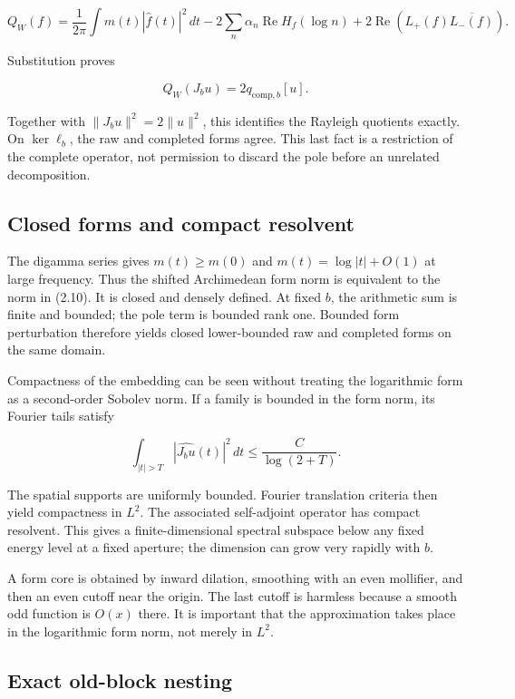 \documentclass[
  10pt,
  a4paper,
  10pt,
  oneside,
  openany]{book}
\begin{document}
\[
Q_W(f)=\frac1{2\pi}\int m(t)|\widehat f(t)|^2\,dt
-2\sum_n\alpha_n\operatorname{Re}H_f(\log n)
+2\operatorname{Re}\!\left(L_+(f)\overline{L_-(f)}\right).
\tag{4.8}\label{eq:4.8}
\]

Substitution proves

\[
Q_W(J_bu)=2q_{\mathrm{comp},b}[u].
\tag{4.9}\label{eq:4.9}
\]

Together with \(\|J_bu\|^2=2\|u\|^2\), this identifies the Rayleigh
quotients exactly. On \(\ker\ell_b\), the raw and completed forms agree.
This last fact is a restriction of the complete operator, not permission
to discard the pole before an unrelated decomposition.

\subsection{Closed forms and compact
resolvent}\label{closed-forms-and-compact-resolvent}

The digamma series gives \(m(t)\ge m(0)\) and \(m(t)=\log|t|+O(1)\) at
large frequency. Thus the shifted Archimedean form norm is equivalent to
the norm in (2.10). It is closed and densely defined. At fixed \(b\),
the arithmetic sum is finite and bounded; the pole term is bounded rank
one. Bounded form perturbation therefore yields closed lower-bounded raw
and completed forms on the same domain.

Compactness of the embedding can be seen without treating the
logarithmic form as a second-order Sobolev norm. If a family is bounded
in the form norm, its Fourier tails satisfy

\[
\int_{|t|>T}|\widehat{J_bu}(t)|^2\,dt
\le\frac{C}{\log(2+T)}.
\tag{4.10}\label{eq:4.10}
\]

The spatial supports are uniformly bounded. Fourier translation criteria
then yield compactness in \(L^2\). The associated self-adjoint operator
has compact resolvent. This gives a finite-dimensional spectral subspace
below any fixed energy level at a fixed aperture; the dimension can grow
very rapidly with \(b\).

A form core is obtained by inward dilation, smoothing with an even
mollifier, and then an even cutoff near the origin. The last cutoff is
harmless because a smooth odd function is \(O(x)\) there. It is
important that the approximation takes place in the logarithmic form
norm, not merely in \(L^2\).

\subsection{Exact old-block nesting}\label{exact-old-block-nesting}
\end{document}
